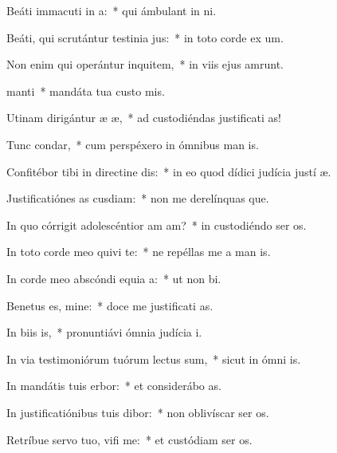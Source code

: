 \item Beáti immacuti in a:~* qui ámbulant in  ni.
\item Beáti, qui scrutántur testinia jus:~* in toto corde ex um.
\item Non enim qui operántur inquitem,~* in viis ejus amrunt.
\item {} manti~* mandáta tua custo mis.
\item Utinam dirigántur æ æ,~* ad custodiéndas justificati as!
\item Tunc  condar,~* cum perspéxero in ómnibus man is.
\item Confitébor tibi in directine dis:~* in eo quod dídici judícia justí æ.
\item Justificatiónes as cusdiam:~* non me derelínquas que.
\item In quo córrigit adolescéntior am am?~* in custodiéndo ser os.
\item In toto corde meo quivi te:~* ne repéllas me a man is.
\item In corde meo abscóndi equia a:~* ut non  bi.
\item Benetus es, mine:~* doce me justificati as.
\item In biis is,~* pronuntiávi ómnia judícia  i.
\item In via testimoniórum tuórum lectus sum,~* sicut in ómni is.
\item In mandátis tuis erbor:~* et considerábo  as.
\item In justificatiónibus tuis dibor:~* non oblivíscar ser os.
\item Retríbue servo tuo, vifi me:~* et custódiam ser os.
